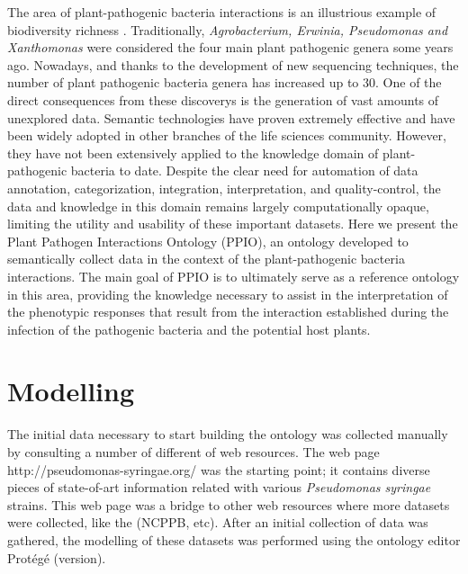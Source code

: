 \documentclass[sw]{iosart2c}
\begin{document}
The area of plant-pathogenic bacteria interactions is an illustrious example of biodiversity richness \cite{Bull2010}. Traditionally, {\itshape Agrobacterium, Erwinia, Pseudomonas and Xanthomonas} were considered the four main plant pathogenic genera some years ago. Nowadays, and thanks to the development of new sequencing techniques, the number of plant pathogenic bacteria genera has increased up to 30. One of the direct consequences from these discoverys is the generation of vast amounts of unexplored data. Semantic technologies have proven extremely effective and have been widely adopted in other branches of the life sciences community. However, they have not been extensively applied to the knowledge domain of plant-pathogenic bacteria to date. Despite the clear need for automation of data annotation, categorization, integration, interpretation, and quality-control, the data and knowledge in this domain remains largely computationally opaque, limiting the utility and usability of these important datasets. Here we present the Plant Pathogen Interactions Ontology (PPIO), an ontology developed to semantically collect data in the context of the plant-pathogenic bacteria interactions. The main goal of PPIO is to ultimately serve as a reference ontology in this area, providing the knowledge necessary to assist in the interpretation of the phenotypic responses that result from the interaction established during the infection of the pathogenic bacteria and the potential host plants.




\section{Modelling}

The initial data necessary to start building the ontology was collected manually by consulting a number of different of web resources. The web page http://pseudomonas-syringae.org/ was the starting point; it contains diverse pieces of state-of-art information related with various {\itshape Pseudomonas syringae} strains. This web page was a bridge to other web resources where more datasets were collected, like the (NCPPB, etc). After an initial collection of data was gathered, the modelling of these datasets was performed using the ontology editor Prot\'eg\'e (version). 
\end{document}
